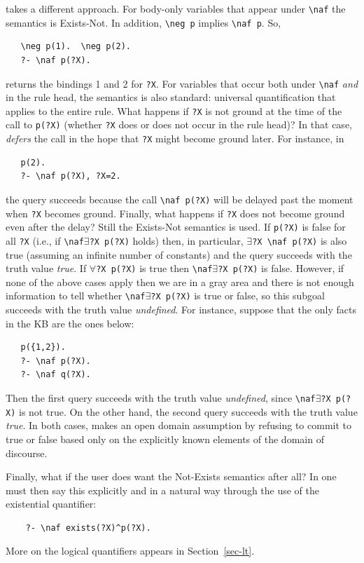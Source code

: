 \documentclass[11pt]{article}
\newcommand{\ERGO}{\mbox{\smaller{\ensuremath{\cal{E}}\smaller{{\sc{RGO}}}}}\xspace}
\newcommand{\FLSYSTEM}{\ERGO}
\newcommand{\bs}{\textbackslash}
\newcommand{\RULELOGNAF}{{\texttt{{\bs}naf}}\xspace}
\newcommand{\RULELOGNEG}{{\texttt{{\bs}neg}}\xspace}
\begin{document}
\FLSYSTEM takes a different approach. For body-only variables that appear
under \texttt{\RULELOGNAF} the semantics is Exists-Not. In addition, \texttt{\RULELOGNEG p}
implies \texttt{\RULELOGNAF p}. So,
\begin{verbatim}
   \neg p(1).  \neg p(2).
   ?- \naf p(?X).
\end{verbatim}
returns the bindings 1 and 2 for \texttt{?X}. For variables that occur both
under \texttt{\RULELOGNAF} \emph{and} in the rule head, the semantics is also standard:
universal quantification that applies to the entire rule.
What happens if \texttt{?X} is not ground at the time of the call to
\texttt{p(?X)} (whether \texttt{?X} does or does not occur in the rule head)?
In that case, \FLSYSTEM \emph{defers} the call in the hope that \texttt{?X}
might become ground later. For instance, in
\begin{verbatim}
   p(2).
   ?- \naf p(?X), ?X=2.
\end{verbatim}
the query succeeds because the call \texttt{\RULELOGNAF p(?X)} will be delayed past
the moment when \texttt{?X} becomes ground.   
Finally, what happens if \texttt{?X} does not become ground even after the
delay? Still the Exists-Not semantics is used. If \texttt{p(?X)} is false
for all \texttt{?X} (i.e., if \texttt{\RULELOGNAF $\exists$?X p(?X)} holds) then, in
particular, \texttt{$\exists$?X \RULELOGNAF p(?X)} is also true (assuming an
infinite number of constants) and the query
succeeds with the truth value \emph{true}.
If \texttt{$\forall$?X p(?X)} is true then \texttt{\RULELOGNAF $\exists$?X
  p(?X)}  is false.  
However, if none of the above cases apply then we are in a gray area
and there is not enough information to tell whether
\texttt{\RULELOGNAF $\exists$?X p(?X)} is true or false, so this subgoal
succeeds with the truth
value \emph{undefined}. For instance, suppose that the only facts in the KB
are the ones below:
\begin{verbatim}
   p({1,2}).
   ?- \naf p(?X).
   ?- \naf q(?X).
\end{verbatim}
Then the first query succeeds with the truth value \emph{undefined}, since
\texttt{\RULELOGNAF $\exists$?X p(?X)} is not true. On the other hand, the second
query succeeds with the truth value \emph{true}. 
In both cases, \FLSYSTEM makes an open domain assumption by refusing to commit
to true or false based only on the explicitly known elements of the domain
of discourse.

Finally, what if the user does want the Not-Exists semantics after all?
In \FLSYSTEM one must then say this explicitly and in a natural way through
the use of the existential quantifier:
\begin{verbatim}
    ?- \naf exists(?X)^p(?X).
\end{verbatim}
More on the logical quantifiers appears in Section~\ref{sec-lt}.
\end{document}
